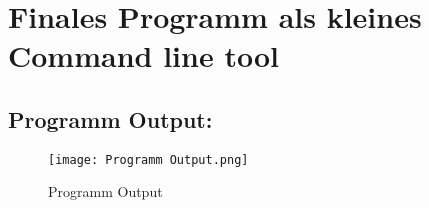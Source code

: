 \newpage
\section{Finales Programm als kleines Command line tool}




\subsection{Programm Output:}
\begin{figure}[!htb]
    \centering
    \texttt{[image: Programm Output.png]}
    \caption{Programm Output}
    \label{caption:Programm Output}
\end{figure}






